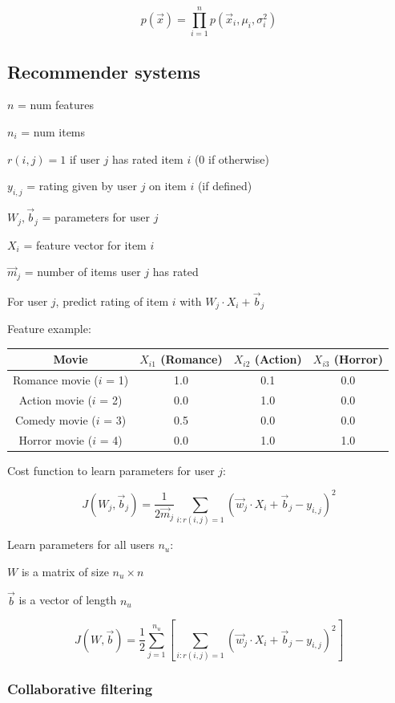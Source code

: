 \documentclass[12pt]{article}
\begin{document}
\[ p(\vec{x}) = \prod_{i=1}^n p(\vec{x}_i,\mu_i,\sigma_i^2) \]

\subsection{Recommender systems}

$n$ = num features

$n_i$ = num items

$r(i,j) = 1$ if user $j$ has rated item $i$ (0 if otherwise)

$y_{i,j}$ = rating given by user $j$ on item $i$ (if defined)

$W_j,\vec{b}_j$ = parameters for user $j$

$X_i$ = feature vector for item $i$

$\vec{m}_j$ = number of items user $j$ has rated

For user $j$, predict rating of item $i$ with $W_j \cdot X_i + \vec{b}_j$

Feature example:

\begin{center}
    \begin{tabular}{ ||c|c|c|c|| }
        \hline
        Movie & $X_{i1}$ (Romance) & $X_{i2}$ (Action) & $X_{i3}$ (Horror)\\
        \hline
        Romance movie ($i$ = 1) & 1.0 & 0.1 & 0.0\\
        Action movie ($i$ = 2) & 0.0 & 1.0 & 0.0\\
        Comedy movie ($i$ = 3) & 0.5 & 0.0 & 0.0\\
        Horror movie ($i$ = 4) & 0.0 & 1.0 & 1.0\\
        \hline
    \end{tabular}
\end{center}

Cost function to learn parameters for user $j$:

\[ J(W_j,\vec{b}_j) = \frac{1}{2\vec m_j} \sum_{i:r(i,j)=1} (\vec w_j \cdot X_i + \vec b_j - y_{i,j})^2 \]

Learn parameters for all users $n_u$:

$W$ is a matrix of size $n_u \times n$

$\vec{b}$ is a vector of length $n_u$

\[ J(W,\vec{b}) = \frac{1}{2} \sum_{j=1}^{n_u} \left[ \sum_{i:r(i,j)=1} (\vec{w}_j \cdot X_i + \vec b_j - y_{i,j})^2 \right] \]

\subsubsection{Collaborative filtering}
\end{document}
